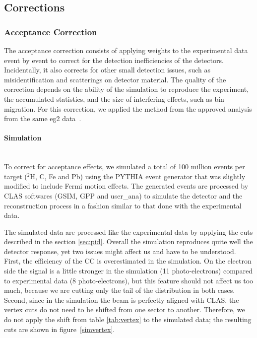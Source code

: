 \subsection{Corrections}
\label{sec:corrections}

\subsubsection{Acceptance Correction}
\label{sec:accept}

The acceptance correction consists of applying weights to the experimental data
event by event to correct for the detection inefficiencies of the detectors.
Incidentally, it also corrects for other small detection issues, such as 
misidentification and scatterings on detector material. The quality 
of the correction depends on the ability of the simulation to reproduce the 
experiment, the accumulated statistics, and the size of interfering effects, such 
as bin migration. For this correction, we applied the method from the 
approved analysis from the same eg2 data~\cite{ElFassi:2008}.

\paragraph{Simulation} ~\\
To correct for acceptance effects, we simulated a total of 100 million events 
per target ($^2$H, C, Fe and Pb) using the PYTHIA \cite{Sjostrand:2006za} 
event generator that was slightly modified to include Fermi motion effects. The 
generated events are processed by CLAS softwares (GSIM, GPP and user\_ana) 
to simulate the detector and the reconstruction process in a fashion similar 
to that done with the experimental data.

The simulated data are processed like the experimental data by 
applying the cuts described in the section \ref{sec:pid}. Overall the 
simulation reproduces quite well the detector response, yet two issues might 
affect us and have to be understood. First, the efficiency of the CC is 
overestimated in the simulation. On the electron side the signal is a little stronger in the simulation (11 
photo-electrons) compared to experimental data (8 photo-electrons), but this 
feature should not affect us too much, because we are cutting only the tail of the 
distribution in both cases. Second, since in the simulation the beam is perfectly 
aligned with CLAS, the vertex cuts do not need to be shifted from one sector to 
another. Therefore, we do not apply the shift from table \ref{tab:vertex} to the 
simulated data; the resulting cuts are shown in figure~\ref{simvertex}.

